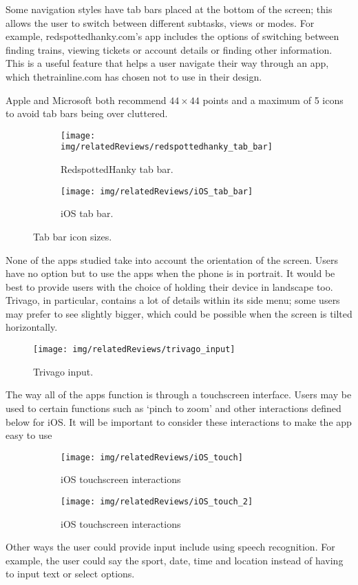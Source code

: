 Some navigation styles have tab bars placed at the bottom of the screen; this
allows the user to switch between different subtasks, views or modes. For
example, redspottedhanky.com's app includes the options of switching between
finding trains, viewing tickets or account details or finding other
information. This is a useful feature that helps a user navigate their way
through an app, which thetrainline.com has chosen not to use in their design.

Apple and Microsoft both recommend $44\times44$ points and a maximum of 5 icons
to avoid tab bars being over cluttered.
\begin{figure}[htbp]
	\centering
	\begin{subfigure}[b]{0.35\textwidth}
		\texttt{[image: img/relatedReviews/redspottedhanky\_tab\_bar]}
		\caption{RedspottedHanky tab bar. }\label{fig:redspottedhanky_tab_bar}
	\end{subfigure}%
	\qquad
	\begin{subfigure}[b]{0.4\textwidth}
		\texttt{[image: img/relatedReviews/iOS\_tab\_bar]}
		\caption{iOS tab bar.}\label{fig:iOS_tab_bar}
	\end{subfigure}
	\caption{Tab bar icon sizes.}
\end{figure}

None of the apps studied take into account the orientation of the screen. Users
have no option but to use the apps when the phone is in portrait. It would be
best to provide users with the choice of holding their device in landscape too.
Trivago, in particular, contains a lot of details within its side menu; some
users may prefer to see slightly bigger, which could be possible when the
screen is tilted horizontally.
\begin{figure}[htbp]
	\begin{center}
		\texttt{[image: img/relatedReviews/trivago\_input]}
	\end{center}
	\caption{Trivago input\cite{TrivagoIOS}. }\label{fig:trivago_input}
\end{figure}

The way all of the apps function is through a touchscreen interface. Users may
be used to certain functions such as `pinch to zoom' and other interactions
defined below for iOS\@. It will be important to consider these interactions to
make the app easy to use
\begin{figure}[htbp]
	\centering
	\begin{subfigure}[b]{0.4\textwidth}
		\texttt{[image: img/relatedReviews/iOS\_touch]}
		\caption{iOS touchscreen interactions}\label{fig:iOS_touch}
	\end{subfigure}%
	\qquad
	\begin{subfigure}[b]{0.4\textwidth}
		\texttt{[image: img/relatedReviews/iOS\_touch\_2]}
		\caption{iOS touchscreen interactions}
	\end{subfigure}
	\caption{}\label{fig:iOS_touch2}
\end{figure}

Other ways the user could provide input include using speech recognition. For
example, the user could say the sport, date, time and location instead of
having to input text or select options.

